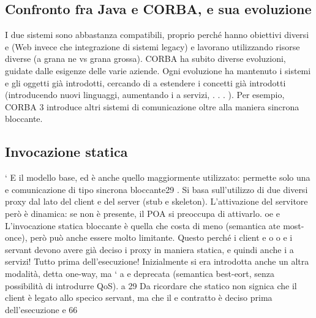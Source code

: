 \subsection{Confronto fra Java e CORBA, e sua evoluzione}
I due sistemi sono abbastanza compatibili, proprio perché hanno obiettivi diversi
e
(Web invece che integrazione di sistemi legacy) e lavorano utilizzando risorse
diverse (a grana ne vs grana grossa).
CORBA ha subito diverse evoluzioni, guidate dalle esigenze delle varie aziende.
Ogni evoluzione ha mantenuto i sistemi e gli oggetti già introdotti, cercando di
a
estendere i concetti già introdotti (introducendo nuovi linguaggi, aumentando i
a
servizi, . . . ). Per esempio, CORBA 3 introduce altri sistemi di comunicazione
oltre alla maniera sincrona bloccante.
\subsection{Invocazione statica}
`
E il modello base, ed è anche quello maggiormente utilizzato: permette solo una
e
comunicazione di tipo sincrona bloccante29 . Si basa sull'utilizzo di due diversi
proxy dal lato del client e del server (stub e skeleton). L'attivazione del servitore
però è dinamica: se non è presente, il POA si preoccupa di attivarlo.
oe
e
L'invocazione statica bloccante è quella che costa di meno (semantica ate
most-once), però può anche essere molto limitante. Questo perché i client e
o
o
e
i servant devono avere già deciso i proxy in maniera statica, e quindi anche i
a
servizi! Tutto prima dell'esecuzione!
Inizialmente si era introdotta anche un altra modalità, detta one-way, ma `
a
e
deprecata (semantica best-eort, senza possibilità di introdurre QoS).
a
29 Da ricordare che statico non signica che il client è legato allo specico servant, ma che il
e
contratto è deciso prima dell'esecuzione
e
66
